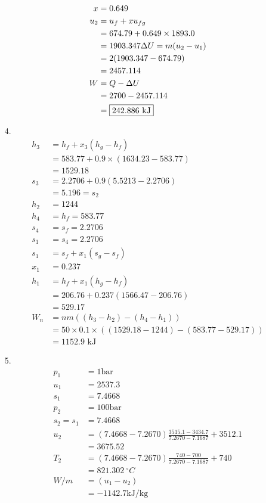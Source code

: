\documentclass{article}
\begin{document}
\begin{itemize}
\begin{align*}
        x&=0.649\\
        u_2 &= u_f+x u_{fg}\\
        &= 674.79 + 0.649\times 1893.0\\
        &=1903.347
        \Delta U = m(u_2-u_1)\\
        &=2(1903.347-674.79)\\
        &=2457.114\\
        W &= Q-\Delta U\\
        &=2700-2457.114\\
        &=\fbox{242.886 kJ}\\
    \end{align*}
    \item[4.] 
    \begin{align*}
        h_3 &= h_f+x_3(h_g-h_f)\\
        &=583.77+0.9\times (1634.23-583.77)\\
        &=1529.18\\
        s_3 &= 2.2706+0.9(5.5213-2.2706)\\
        &=5.196 = s_2\\
        h_2 &= 1244\\
        h_4 &=h_f = 583.77\\
        s_4 &=s_f = 2.2706\\
        s_1 &= s_4 = 2.2706\\
        s_1&= s_f+x_1(s_g-s_f)\\
        x_1 &=0.237\\
        h_1 &=h_f+x_1(h_g-h_f)\\
        &=206.76+0.237(1566.47-206.76)\\
        &=529.17\\
        W_n&=nm((h_3-h_2)-(h_4-h_1))\\
        &=50\times 0.1 \times ((1529.18-1244)-(583.77-529.17))\\
        &=1152.9 \text{ kJ}
    \end{align*}
    \item[5.]
    \begin{align*}
        p_1 &= 1 \text{bar}\\
        u_1 &= 2537.3\\
        s_1 &=7.4668\\
        p_2 &= 100 \text{bar}\\
        s_2=s_1 &=7.4668\\
        u_2 &=(7.4668-7.2670)\frac{3515.1-3434.7}{7.2670-7.1687}+3512.1\\
        &= 3675.52\\
        T_2 &= (7.4668-7.2670)\frac{740-700}{7.2670-7.1687}+740\\
        &=821.302\ ^\circ C\\
        W/m &=(u_1-u_2)\\
        &=-1142.7 \text{kJ/kg}
    \end{align*}
\end{itemize}     
\end{document}
